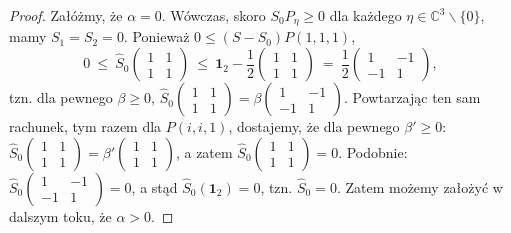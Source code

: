 {\begin{proof}
Załóżmy, że $\alpha = 0$.
Wówczas, skoro $S_{0} P_{\eta} \geq 0$ dla każdego
$\eta \in \mathbb{C}^{3}\backslash\{0\}$,
mamy $S_{1} = S_{2} = 0$.
Ponieważ
$0 \leq (S - S_{0}) P(1,1,1)$,
\begin{equation}
0 \: \leq \: \hat{S}_{0} \begin{pmatrix}
    1 & 1 \\ 1 & 1
    \end{pmatrix} \: \leq \:
    \mathbf{1}_{2} - \frac{1}{2} \begin{pmatrix}
                1 & 1 \\ 1 & 1
                \end{pmatrix} \: = \:
    \frac{1}{2}
    \begin{pmatrix}
    1 & -1 \\ -1 & 1
    \end{pmatrix},
\end{equation}
tzn. dla pewnego $\beta \geq 0$,
$
\hat{S}_{0} \left( \begin{smallmatrix}
    1 & 1 \\ 1 & 1
    \end{smallmatrix} \right) =
    \beta \left(
    \begin{smallmatrix}
    1 & -1 \\ -1 & 1
    \end{smallmatrix} \right)
$.
Powtarzając ten sam rachunek, tym razem dla $P(i,i,1)$,
dostajemy, że dla pewnego $\beta' \geq 0$:
$
\hat{S}_{0} \left( \begin{smallmatrix}
    1 & 1 \\ 1 & 1
    \end{smallmatrix} \right) =
    \beta' \left(
    \begin{smallmatrix}
    1 & 1 \\ 1 & 1
    \end{smallmatrix} \right)
$,
a zatem
$
\hat{S}_{0} \left( \begin{smallmatrix}
    1 & 1 \\ 1 & 1
    \end{smallmatrix} \right) = 0
$.
Podobnie:
$
\hat{S}_{0} \left( \begin{smallmatrix}
    1 & -1 \\ -1 & 1
    \end{smallmatrix} \right) = 0
$, a stąd
$\hat{S}_{0}(\mathbf{1}_{2}) = 0$, tzn. $\hat{S}_{0} = 0$.
Zatem możemy założyć w dalszym toku, że $\alpha > 0$.


\end{proof}}
